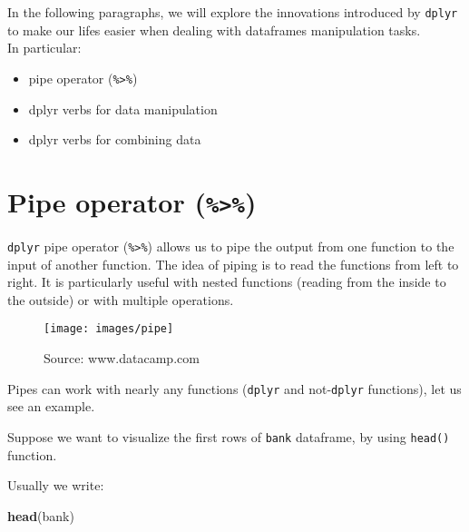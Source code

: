 \documentclass[]{book}
\newenvironment{Shaded}{\begin{snugshade}}{\end{snugshade}}
\newcommand{\KeywordTok}[1]{\textcolor[rgb]{0.13,0.29,0.53}{\textbf{{#1}}}}
\newcommand{\NormalTok}[1]{{#1}}
\providecommand{\tightlist}{%
  \setlength{\itemsep}{0pt}\setlength{\parskip}{0pt}}
\def\tightlist{}
\begin{document}
In the following paragraphs, we will explore the innovations introduced
by \texttt{dplyr} to make our lifes easier when dealing with dataframes
manipulation tasks.\\
In particular:

\begin{itemize}
\tightlist
\item
  pipe operator (\texttt{\%\textgreater{}\%})
\item
  dplyr verbs for data manipulation
\item
  dplyr verbs for combining data
\end{itemize}

\section{\texorpdfstring{Pipe operator
(\texttt{\%\textgreater{}\%})}{Pipe operator (\%\textgreater{}\%)}}\label{pipe-operator}

\texttt{dplyr} pipe operator (\texttt{\%\textgreater{}\%}) allows us to
pipe the output from one function to the input of another function. The
idea of piping is to read the functions from left to right. It is
particularly useful with nested functions (reading from the inside to
the outside) or with multiple operations.

\clearpage

\begin{figure}

{\centering \texttt{[image: images/pipe]} 

}

\caption{Source: www.datacamp.com}\label{fig:g2}
\end{figure}

Pipes can work with nearly any functions (\texttt{dplyr} and
not-\texttt{dplyr} functions), let us see an example.

Suppose we want to visualize the first rows of \texttt{bank} dataframe,
by using \texttt{head()} function.

Usually we write:

\begin{Shaded}
\begin{Highlighting}[]
\KeywordTok{head}\NormalTok{(bank)}
\end{Highlighting}
\end{Shaded}
\end{document}
